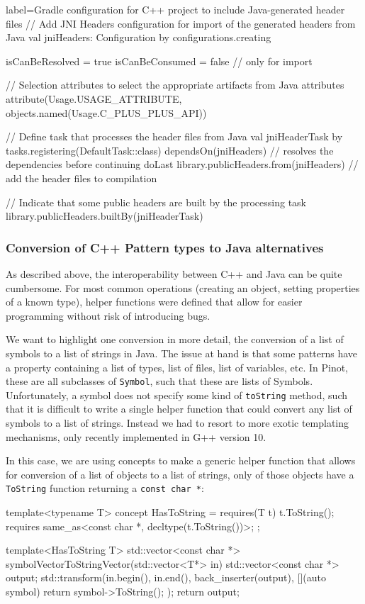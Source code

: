 \begin{kotlinlong*}{label=\rm Gradle configuration for C++ project to include Java-generated header files}
// Add JNI Headers configuration for import of the generated headers from Java
val jniHeaders: Configuration by configurations.creating {
    isCanBeResolved = true
    isCanBeConsumed = false // only for import
    
    // Selection attributes to select the appropriate artifacts from Java
    attributes {
        attribute(Usage.USAGE_ATTRIBUTE, objects.named(Usage.C_PLUS_PLUS_API))
    }
    
    // Define task that processes the header files from Java
    val jniHeaderTask by tasks.registering(DefaultTask::class) {
        dependsOn(jniHeaders) // resolves the dependencies before continuing
        doLast {
            library.publicHeaders.from(jniHeaders) // add the header files to compilation
        }
    }
    
    // Indicate that some public headers are built by the processing task
    library.publicHeaders.builtBy(jniHeaderTask)
}
\end{kotlinlong*}

\subsubsection{Conversion of C++ Pattern types to Java alternatives}
As described above, the interoperability between C++ and Java can be quite cumbersome. For most common operations (creating an object, setting properties of a known type), helper functions were defined that allow for easier programming without risk of introducing bugs.

We want to highlight one conversion in more detail, the conversion of a list of symbols to a list of strings in Java. The issue at hand is that some patterns have a property containing a list of types, list of files, list of variables, etc. In Pinot, these are all subclasses of {\tt Symbol}, such that these are lists of Symbols. Unfortunately, a symbol does not specify some kind of {\tt toString} method, such that it is difficult to write a single helper function that could convert any list of symbols to a list of strings. Instead we had to resort to more exotic templating mechanisms, only recently implemented in G++ version 10.

In this case, we are using concepts to make a generic helper function that allows for conversion of a list of objects to a list of strings, only of those objects have a {\tt ToString} function returning a {\tt const char *}:
\begin{cpplong}
template<typename T> concept HasToString = requires(T t) {
    t.ToString();
    requires same_as<const char *, decltype(t.ToString())>;
};

template<HasToString T> std::vector<const char *> symbolVectorToStringVector(std::vector<T*> in) {
    std::vector<const char *> output;
    std::transform(in.begin(), in.end(), back_inserter(output), [](auto symbol) { return symbol->ToString(); });
    return output;
}
\end{cpplong}
